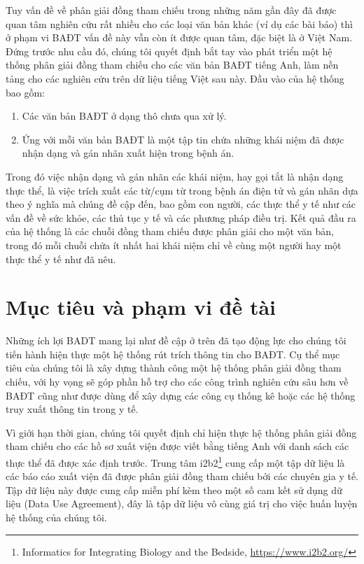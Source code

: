 Tuy vấn đề về phân giải đồng tham chiếu trong những năm gần đây đã được quan tâm nghiên cứu rất nhiều cho các loại văn bản khác (ví dụ các bài báo) thì ở phạm vi BAĐT vấn đề này vẫn còn ít được quan tâm, đặc biệt là ở Việt Nam. Đứng trước nhu cầu đó, chúng tôi quyết định bắt tay vào phát triển một hệ thống phân giải đồng tham chiếu cho các văn bản BAĐT tiếng Anh, làm nền tảng cho các nghiên cứu trên dữ liệu tiếng Việt sau này. Đầu vào của hệ thống bao gồm: 
\begin{enumerate}
\item Các văn bản BAĐT ở dạng thô chưa qua xử lý.
\item Ứng với mỗi văn bản BAĐT là một tập tin chứa những khái niệm đã được nhận dạng và gán nhãn xuất hiện trong bệnh án.
\end{enumerate}

Trong đó việc nhận dạng và gán nhãn các khái niệm, hay gọi tắt là nhận dạng thực thể, là việc trích xuất các từ/cụm từ trong bệnh án điện tử và gán nhãn dựa theo ý nghĩa mà chúng đề cập đến, bao gồm con người, các thực thể y tế như các vấn đề về sức khỏe, các thủ tục y tế và các phương pháp điều trị. Kết quả đầu ra của hệ thống là các chuỗi đồng tham chiếu được phân giải cho một văn bản, trong đó mỗi chuỗi chứa ít nhất hai khái niệm chỉ về cùng một người hay một thực thể y tế như đã nêu.

\section{Mục tiêu và phạm vi đề tài}
Những ích lợi BADT mang lại như đề cập ở trên đã tạo động lực cho chúng tôi tiến hành hiện thực một hệ thống rút trích thông tin cho BAĐT. Cụ thể mục tiêu của chúng tôi là xây dựng thành công một hệ thống phân giải đồng tham chiếu, với hy vọng sẽ góp phần hỗ trợ cho các công trình nghiên cứu sâu hơn về BAĐT cũng như được dùng để xây dựng các công cụ thống kê hoặc các hệ thống truy xuất thông tin trong y tế.

Vì giới hạn thời gian, chúng tôi quyết định chỉ hiện thực hệ thống phân giải đồng tham chiếu cho các hồ sơ xuất viện được viết bằng tiếng Anh với danh sách các thực thể đã được xác định trước. Trung tâm i2b2\footnote{Informatics for Integrating Biology and the Bedside, \url{https://www.i2b2.org/}} cung cấp một tập dữ liệu là các báo cáo xuất viện đã được phân giải đồng tham chiếu bởi các chuyên gia y tế. Tập dữ liệu này được cung cấp miễn phí kèm theo một số cam kết sử dụng dữ liệu (Data Use Agreement), đây là tập dữ liệu vô cùng giá trị cho việc huấn luyện hệ thống của chúng tôi. 

